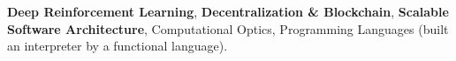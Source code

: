 \textbf{Deep Reinforcement Learning}, \textbf{Decentralization \& Blockchain}, \textbf{Scalable Software Architecture}, Computational Optics, Programming Languages (built an interpreter by a functional language).